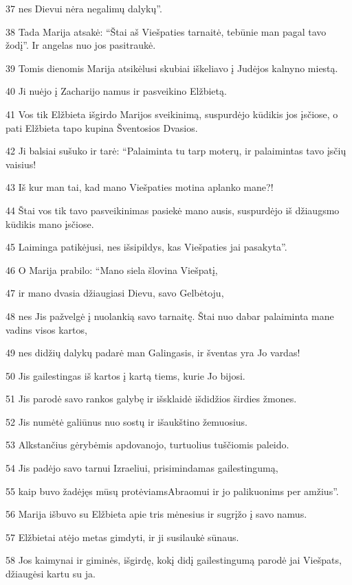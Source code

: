\par 37 nes Dievui nėra negalimų dalykų”. 
\par 38 Tada Marija atsakė: “Štai aš Viešpaties tarnaitė, tebūnie man pagal tavo žodį”. Ir angelas nuo jos pasitraukė. 
\par 39 Tomis dienomis Marija atsikėlusi skubiai iškeliavo į Judėjos kalnyno miestą. 
\par 40 Ji nuėjo į Zacharijo namus ir pasveikino Elžbietą. 
\par 41 Vos tik Elžbieta išgirdo Marijos sveikinimą, suspurdėjo kūdikis jos įsčiose, o pati Elžbieta tapo kupina Šventosios Dvasios. 
\par 42 Ji balsiai sušuko ir tarė: “Palaiminta tu tarp moterų, ir palaimintas tavo įsčių vaisius! 
\par 43 Iš kur man tai, kad mano Viešpaties motina aplanko mane?! 
\par 44 Štai vos tik tavo pasveikinimas pasiekė mano ausis, suspurdėjo iš džiaugsmo kūdikis mano įsčiose. 
\par 45 Laiminga patikėjusi, nes išsipildys, kas Viešpaties jai pasakyta”. 
\par 46 O Marija prabilo: “Mano siela šlovina Viešpatį, 
\par 47 ir mano dvasia džiaugiasi Dievu, savo Gelbėtoju, 
\par 48 nes Jis pažvelgė į nuolankią savo tarnaitę. Štai nuo dabar palaiminta mane vadins visos kartos, 
\par 49 nes didžių dalykų padarė man Galingasis, ir šventas yra Jo vardas! 
\par 50 Jis gailestingas iš kartos į kartą tiems, kurie Jo bijosi. 
\par 51 Jis parodė savo rankos galybę ir išsklaidė išdidžios širdies žmones. 
\par 52 Jis numėtė galiūnus nuo sostų ir išaukštino žemuosius. 
\par 53 Alkstančius gėrybėmis apdovanojo, turtuolius tuščiomis paleido. 
\par 54 Jis padėjo savo tarnui Izraeliui, prisimindamas gailestingumą, 
\par 55 kaip buvo žadėjęs mūsų protėviams­Abraomui ir jo palikuonims per amžius”. 
\par 56 Marija išbuvo su Elžbieta apie tris mėnesius ir sugrįžo į savo namus. 
\par 57 Elžbietai atėjo metas gimdyti, ir ji susilaukė sūnaus. 
\par 58 Jos kaimynai ir giminės, išgirdę, kokį didį gailestingumą parodė jai Viešpats, džiaugėsi kartu su ja. 
